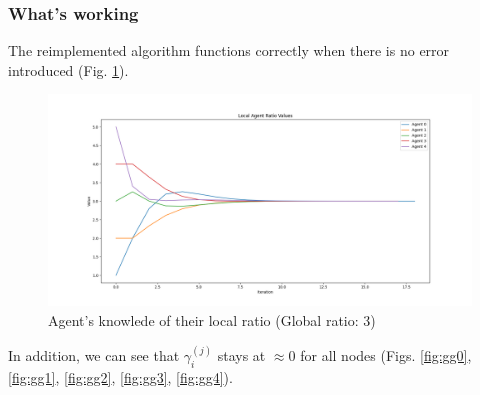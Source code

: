 \documentclass[11pt]{article}
\begin{document}
\subsubsection*{What's working}
The reimplemented algorithm functions correctly when there is no error introduced (Fig. \ref{fig:central_good}).
\begin{figure}[h!]
    \centering
    \includegraphics[width=\textwidth]{img/vanilla_centralized_ratios.png}
    \caption{Agent's knowlede of their local ratio (Global ratio: 3)}
    \label{fig:central_good}
\end{figure}
In addition, we can see that $\gamma_i^{(j)}$ stays at $\approx0$ for all nodes
(Figs. \ref{fig:gg0}, \ref{fig:gg1}, \ref{fig:gg2}, \ref{fig:gg3}, \ref{fig:gg4}).
\end{document}
